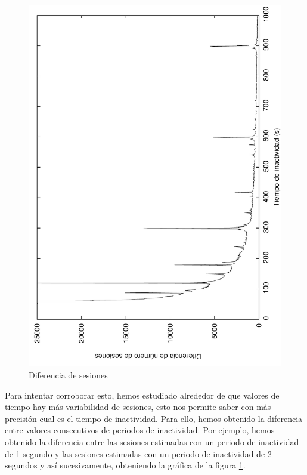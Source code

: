 \documentclass[twocolumn]{Jornadas}
\begin{document}
\begin{figure}[]
\begin{center}
  \includegraphics[scale=0.30,angle=-90]{figures/diffInactivitiPeriod_full.pdf}
\end{center}
\caption{Diferencia de sesiones} \label{fig:diffSessions}
\end{figure}

Para intentar corroborar esto, hemos estudiado alrededor de que valores de tiempo hay más variabilidad de sesiones, esto nos permite saber con más precisión cual es el tiempo de inactividad. Para ello, hemos obtenido la diferencia entre valores consecutivos de periodos de inactividad. Por ejemplo, hemos obtenido la diferencia entre las sesiones estimadas con un periodo de inactividad de 1 segundo y las sesiones estimadas con un periodo de inactividad de 2 segundos y así sucesivamente, obteniendo la gráfica de la figura \ref{fig:diffSessions}.
\end{document}
